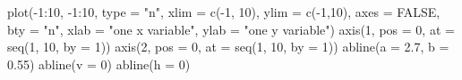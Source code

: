 \begin{Schunk}
\begin{Sinput}
 plot(-1:10, -1:10, type = "n", xlim = c(-1, 10), ylim = c(-1,10), axes = FALSE, bty = "n", xlab = "one x variable", ylab = "one y variable")
 axis(1, pos = 0, at = seq(1, 10, by = 1))
 axis(2, pos = 0, at = seq(1, 10, by = 1))
 abline(a = 2.7, b = 0.55)
 abline(v = 0)
 abline(h = 0)
\end{Sinput}
\end{Schunk}
